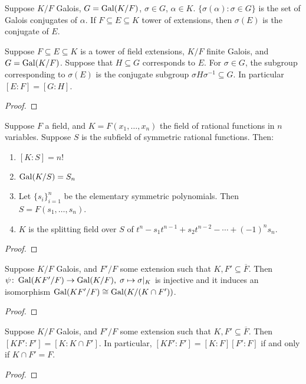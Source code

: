 \begin{definition}
    Suppose \(K/F\) Galois, \(G = \operatorname{Gal}(K/F)\),
    \(\sigma \in G\), \(\alpha \in K\).
    \(\{\sigma(\alpha) : \sigma \in G\}\) is the set of Galois conjugates of \(\alpha\).
    If \(F \subseteq E \subseteq K\) tower of extensions,
    then \(\sigma(E)\) is the conjugate of \(E\).
\end{definition}
\begin{proposition}
    Suppose \(F \subseteq E \subseteq K\) is a tower of field extensions,
    \(K/F\) finite Galois, and \(G = \operatorname{Gal}(K/F)\).
    Suppose that \(H \subseteq G\) corresponds to \(E\).
    For \(\sigma \in G\),
    the subgroup corresponding to \(\sigma(E)\)
    is the conjugate subgroup \(\sigma H \sigma^{-1} \subseteq G\).
    In particular \([E:F] = [G:H]\).
\end{proposition}
\begin{proof}
\end{proof}

\begin{theorem}
    Suppose \(F\) a field, and \(K = F(x_1,\hdots,x_n)\)
    the field of rational functions in \(n\) variables.
    Suppose \(S\) is the subfield of symmetric rational functions.
    Then:
    \begin{enumerate}[label={(\alph*)}, itemsep=0mm]
        \item \([K:S] = n!\)
        \item \(\operatorname{Gal}(K/S) = S_n\)
        \item Let \({\{s_i\}}_{i=1}^n\) be the elementary symmetric polynomials.
            Then \(S = F(s_1,\hdots,s_n)\).
        \item \(K\) is the splitting field over \(S\) of
            \(t^n - s_1 t^{n-1} + s_2 t^{n-2} - \cdots + {(-1)}^n s_n\).
    \end{enumerate}
\end{theorem}
\begin{proof}
\end{proof}

\begin{proposition}
    Suppose \(K/F\) Galois, and \(F'/F\) some extension
    such that \(K,F' \subseteq \overline{F}\).
    Then \(\psi\colon\operatorname{Gal}(KF'/F)\to\operatorname{Gal}(K/F),\;\sigma\mapsto\sigma\vert_K\) is injective
    and it induces an isomorphism \(\operatorname{Gal}(KF'/F) \cong \operatorname{Gal}(K/(K \cap F'))\).
\end{proposition}
\begin{proof}
\end{proof}
\begin{corollary}
    Suppose \(K/F\) Galois, and \(F'/F\) some extension
    such that \(K,F' \subseteq \overline{F}\).
    Then \([KF':F'] = [K:K \cap F']\).
    In particular, \([KF':F'] = [K:F][F':F]\) if and only if \(K \cap F' = F\).
\end{corollary}
\begin{proof}
\end{proof}

